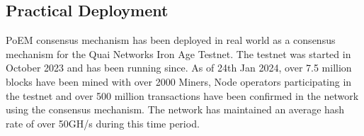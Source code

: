 \subsection{Practical Deployment}
PoEM consensus mechanism has been deployed in real world as a consensus
mechanism for the Quai Networks Iron Age Testnet. The testnet was started in
October 2023 and has been running since. As of 24th Jan 2024, over 7.5 million
blocks have been mined with over 2000 Miners, Node operators participating in
the testnet and over 500 million transactions have been confirmed in the network
using the consensus mechanism. The network has maintained an average hash rate
of over 50GH/s during this time period.
